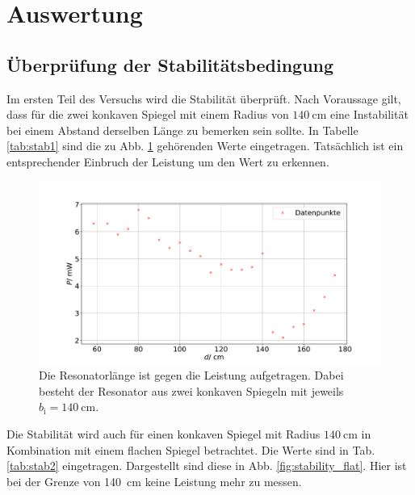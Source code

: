 \section{Auswertung}
\label{sec:Auswertung}

\subsection{Überprüfung der Stabilitätsbedingung}

Im ersten Teil des Versuchs wird die Stabilität überprüft. Nach Voraussage gilt, dass für die zwei konkaven Spiegel mit einem Radius von $\SI{140}{\centi\meter}$ eine Instabilität bei einem Abstand derselben Länge zu bemerken sein sollte. 
In Tabelle \ref{tab:stab1} sind die zu Abb. \ref{fig:stability140} gehörenden Werte eingetragen.
Tatsächlich ist ein entsprechender Einbruch der Leistung um den Wert zu erkennen. %



\begin{figure}
    \centering
    \includegraphics[width=\textwidth]{plots/stability140.pdf}
    \caption{Die Resonatorlänge ist gegen die Leistung aufgetragen. Dabei besteht der Resonator aus zwei konkaven Spiegeln mit jeweils $b_\text{i} = \SI{140}{\centi\meter}$.}
    \label{fig:stability140}
\end{figure} 

Die Stabilität wird auch für einen konkaven Spiegel mit Radius $\SI{140}{\centi\meter}$ in Kombination mit einem flachen Spiegel betrachtet. Die Werte sind in Tab. \ref{tab:stab2} eingetragen. Dargestellt sind diese in Abb. \ref{fig:stability_flat}.
Hier ist bei der Grenze von \SI{140}{\centi\meter} keine Leistung mehr zu messen.

